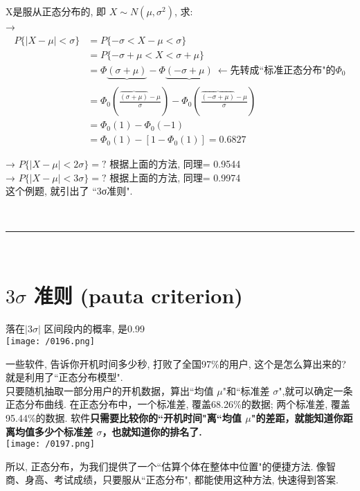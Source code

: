 \documentclass[UTF8]{ctexart}
\begin{document}
\begin{myEnvSample}
X是服从正态分布的, 即 $X\sim N\left( \mu ,\sigma ^2 \right) $, 求: \\
→ 
\begin{align*}  %
	P\{|X-\mu |<\sigma \}
&=P\{-\sigma <X-\mu <\sigma \}\\
&=P\{-\sigma +\mu <X<\sigma +\mu \}\\
&=\varPhi \underset{}{\underbrace{\left( \sigma +\mu \right) }}-\varPhi \underset{}{\underbrace{\left( -\sigma +\mu \right) }}\ \gets \text{先转成``标准正态分布"的}\varPhi _0\\
&=\varPhi _0\left( \frac{\overset{}{\overbrace{(\sigma +\mu )}}-\mu}{\sigma} \right) -\varPhi _0\left( \frac{\overset{}{\overbrace{(-\sigma +\mu )}}-\mu}{\sigma} \right)\\
&=\varPhi _0(1)-\varPhi _0(-1)\\
&=\varPhi _0(1)-\left[ 1-\varPhi _0(1) \right] =0.6827 
\end{align*}

→ $P\{|X-\mu |<2\sigma \} = ?$ 根据上面的方法, 同理= 0.9544 \\
→ $P\{|X-\mu |<3\sigma \} = ?$ 根据上面的方法, 同理= 0.9974 \\

这个例题, 就引出了 ``3σ准则".
\end{myEnvSample}



~\\
\hrule
~\\



\section{$3\sigma$ 准则 (pauta criterion)}

落在$|3\sigma|$ 区间段内的概率, 是0.99 \\

\texttt{[image: /0196.png]}  \\

\begin{myEnvSample}
一些软件, 告诉你开机时间多少秒, 打败了全国97\%的用户, 这个是怎么算出来的? 就是利用了``正态分布模型". \\
只要随机抽取一部分用户的开机数据，算出``均值 $\mu$"和``标准差 $σ$",就可以确定一条正态分布曲线. 在正态分布中，一个标准差, 覆盖68.26\%的数据; 两个标准差, 覆盖95.44\%的数据. 软件\textbf{只需要比较你的``开机时间"离``均值 $\mu$"的差距，就能知道你距离均值多少个标准差 $σ$，也就知道你的排名了.} \\

\texttt{[image: /0197.png]}  
\end{myEnvSample}

所以, 正态分布，为我们提供了一个``估算个体在整体中位置"的便捷方法. 像智商、身高、考试成绩，只要服从``正态分布", 都能使用这种方法, 快速得到答案. \\
\end{document}
